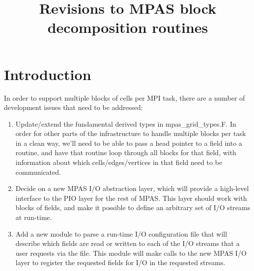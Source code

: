 \documentclass[11pt]{report}
\begin{document}
\title{Revisions to MPAS block decomposition routines}
\author{}

\maketitle
\tableofcontents


%
%
\chapter{Introduction}

In order to support multiple blocks of cells per MPI task, there are a number of
development issues that need to be addressed:

\begin{enumerate}

\item Update/extend the fundamental derived types in mpas\_grid\_types.F.                                
   In order for other parts of the infrastructure to handle multiple                                
   blocks per task in a clean way, we'll need to be able to pass a head                             
   pointer to a field into a routine, and have that routine loop through                            
   all blocks for that field, with information about which cells/edges/vertices                     
   in that field need to be communicated.                                                           
                                                                                                    
\item Decide on a new MPAS I/O abstraction layer, which will provide a                                
   high-level interface to the PIO layer for the rest of MPAS. This layer                           
   should work with blocks of fields, and make it possible to define an                             
   arbitrary set of I/O streams at run-time.                                                        
                                                                                                    
\item Add a new module to parse a run-time I/O configuration file that                                
   will describe which fields are read or written to each of the I/O                                
   streams that a user requests via the file. This module will make calls                           
   to the new MPAS I/O layer to register the requested fields for I/O in                            
   the requested streams.                                          
   

\end{enumerate}
\end{document}
